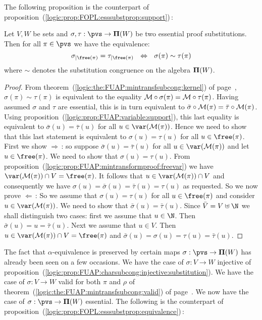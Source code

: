 The following proposition is the counterpart of
proposition~(\ref{logic:prop:FOPL:esssubstprop:support})\,:

\begin{prop}\label{logic:prop:FUAP:esssubstprop:support}
Let $V,W$ be sets and $\sigma,\tau:\pvs\to{\bf\Pi}(W)$ be two
essential proof substitutions. Then for all $\pi\in\pvs$ we have the
equivalence:
    \[
    \sigma_{|\free(\pi)}=\tau_{|\free(\pi)}\ \ \Leftrightarrow\
    \ \sigma(\pi)\sim\tau(\pi)
    \]
where $\sim$ denotes the substitution congruence on the algebra
${\bf\Pi}(W)$.
\end{prop}
\begin{proof}
From theorem~(\ref{logic:the:FUAP:mintransfsubcong:kernel}) of
page~\pageref{logic:the:FUAP:mintransfsubcong:kernel},
$\sigma(\pi)\sim\tau(\pi)$ is equivalent to the equality ${\cal
M}\circ\sigma(\pi)={\cal M}\circ\tau(\pi)$. Having assumed $\sigma$
and $\tau$ are essential, this is in turn equivalent to
$\bar{\sigma}\circ{\cal M}(\pi)=\bar{\tau}\circ{\cal M}(\pi)$. Using
proposition~(\ref{logic:prop:FUAP:variable:support}), this last
equality is equivalent to $\bar{\sigma}(u)=\bar{\tau}(u)$ for all
$u\in\var({\cal M}(\pi))$. Hence we need to show that this last
statement is equivalent to $\sigma(u)=\tau(u)$ for all
$u\in\free(\pi)$. First we show $\Rightarrow$\,: so suppose
$\bar{\sigma}(u)=\bar{\tau}(u)$ for all $u\in\var({\cal M}(\pi))$
and let $u\in\free(\pi)$. We need to show that $\sigma(u)=\tau(u)$.
From proposition~(\ref{logic:prop:FUAP:mintransformproof:freevar})
we have $\var({\cal M}(\pi))\cap V=\free(\pi)$. It follows that
$u\in\var({\cal M}(\pi))\cap V$ and consequently we have
$\sigma(u)=\bar{\sigma}(u)=\bar{\tau}(u)=\tau(u)$ as requested. So
we now prove $\Leftarrow$\,: So we assume that $\sigma(u)=\tau(u)$
for all $u\in\free(\pi)$ and consider $u\in\var({\cal M}(\pi))$. We
need to show that $\bar{\sigma}(u)=\bar{\tau}(u)$. Since
$\bar{V}=V\uplus\N$ we shall distinguish two cases: first we assume
that $u\in\N$. Then $\bar{\sigma}(u)=u=\bar{\tau}(u)$. Next we
assume that $u\in V$. Then $u\in \var({\cal M}(\pi))\cap
V=\free(\pi)$ and $\bar{\sigma}(u)=\sigma(u)=\tau(u)=\bar{\tau}(u)$.
\end{proof}

The fact that $\alpha$-equivalence is preserved by certain maps
$\sigma:\pvs\to{\bf\Pi}(W)$ has already been seen on a few
occasions. We have the case of $\sigma:V\to W$ injective of
proposition~(\ref{logic:prop:FUAP:charsubcong:injective:substitution}).
We have the case of $\sigma:V\to W$ valid for both $\pi$ and $\rho$
of theorem~(\ref{logic:the:FUAP:mintransfsubcong:valid}) of
page~\pageref{logic:the:FUAP:mintransfsubcong:valid}. We now have
the case of $\sigma:\pvs\to{\bf\Pi}(W)$ essential. The following is
the counterpart of
proposition~(\ref{logic:prop:FOPL:esssubstprop:equivalence})\,:

